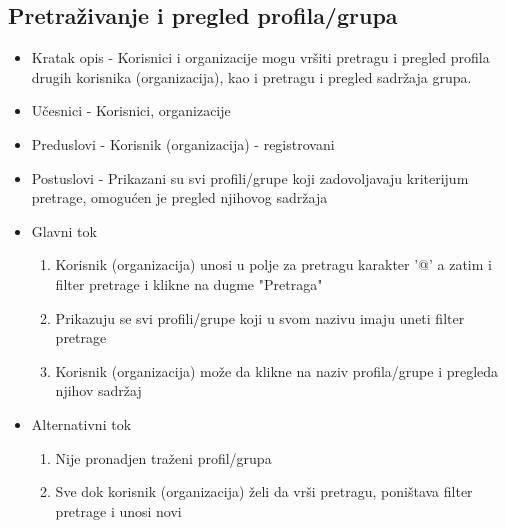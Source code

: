 \subsection{Pretraživanje i pregled profila/grupa}
\begin{itemize}
	\item Kratak opis - Korisnici i organizacije mogu vršiti pretragu i pregled profila drugih korisnika (organizacija), kao i pretragu i pregled sadržaja grupa.
	\item Učesnici - Korisnici, organizacije
	\item Preduslovi - Korisnik (organizacija) - registrovani
	\item Postuslovi - Prikazani su svi profili/grupe koji zadovoljavaju kriterijum pretrage, omogućen je pregled njihovog sadržaja
	\item Glavni tok
	\begin{enumerate}
		\item Korisnik (organizacija) unosi u polje za pretragu karakter '@' a zatim i filter pretrage i klikne na dugme "Pretraga"
		\item Prikazuju se svi profili/grupe koji u svom nazivu imaju uneti filter pretrage
		\item Korisnik (organizacija) može da klikne na naziv profila/grupe i pregleda njihov sadržaj
	\end{enumerate}
	\item Alternativni tok
	\begin{enumerate}
		\item Nije pronadjen traženi profil/grupa
		\item Sve dok korisnik (organizacija) želi da vrši pretragu, poništava filter pretrage i unosi novi
	\end{enumerate}
\end{itemize}


